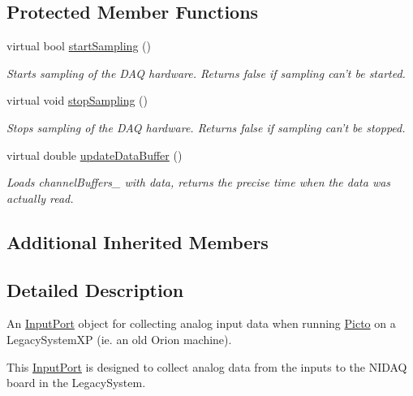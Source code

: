 \subsection*{Protected Member Functions}
\begin{DoxyCompactItemize}
\item 
virtual bool \hyperlink{class_picto_1_1_legacy_system_x_p_analog_input_port_a5815ed96c757adbcb7bb25ddf59f8393}{start\-Sampling} ()
\begin{DoxyCompactList}\small\item\em Starts sampling of the D\-A\-Q hardware. Returns false if sampling can't be started. \end{DoxyCompactList}\item 
\hypertarget{class_picto_1_1_legacy_system_x_p_analog_input_port_afb580c736fa6e629c1af5ac7bdd3931a}{virtual void \hyperlink{class_picto_1_1_legacy_system_x_p_analog_input_port_afb580c736fa6e629c1af5ac7bdd3931a}{stop\-Sampling} ()}\label{class_picto_1_1_legacy_system_x_p_analog_input_port_afb580c736fa6e629c1af5ac7bdd3931a}

\begin{DoxyCompactList}\small\item\em Stops sampling of the D\-A\-Q hardware. Returns false if sampling can't be stopped. \end{DoxyCompactList}\item 
virtual double \hyperlink{class_picto_1_1_legacy_system_x_p_analog_input_port_abbf26628849bbc0ce4946d577bc0db5e}{update\-Data\-Buffer} ()
\begin{DoxyCompactList}\small\item\em Loads channel\-Buffers\-\_\- with data, returns the precise time when the data was actually read. \end{DoxyCompactList}\end{DoxyCompactItemize}
\subsection*{Additional Inherited Members}


\subsection{Detailed Description}
An \hyperlink{class_picto_1_1_input_port}{Input\-Port} object for collecting analog input data when running \hyperlink{namespace_picto}{Picto} on a Legacy\-System\-X\-P (ie. an old Orion machine). 

This \hyperlink{class_picto_1_1_input_port}{Input\-Port} is designed to collect analog data from the inputs to the N\-I\-D\-A\-Q board in the Legacy\-System.

